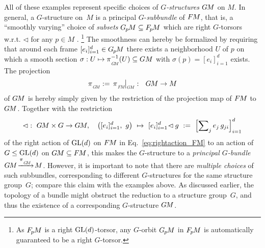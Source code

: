 All of these examples represent specific choices of $G$\emph{-structures} $G\mkern-1.4muM$ on $M$.
In general, a $G$-structure on~$M$ is a principal $G$-\emph{subbundle} of $F\mkern-1.5muM$, that is, a ``smoothly varying'' choice of \emph{subsets} $G_{\mkern-1.3mu p}\mkern-1.2muM \subseteq F_{\mkern-1.5mu p}\mkern-1.0muM$ which are right $G$-torsors w.r.t. $\lhd$ for any $p\in M$ \cite{sternberg1999lectures,piccione2006theory,crainic2013GStructuresExamples}.%
\footnote{\label{footnote:GpM_G_orbit_in_FpM}
    As $F_{\mkern-1.5mu p}\mkern-1.0muM$ is a right $\operatorname{GL}(d)$-torsor, any $G$-orbit $G_{\mkern-1.3mu p}\mkern-1.2muM$ in $F_{\mkern-1.5mu p}\mkern-1.0muM$ is automatically guaranteed to be a right $G$-torsor.
}
The smoothness can hereby be formalized by requiring that around each frame $[e_i]_{i=1}^d \in G_{\mkern-1.3mu p}\mkern-1.2muM$ there exists a neighborhood $U$ of $p$ on which a smooth section $\sigma: U \mapsto \piGM^{-1}(U) \subseteq GM$ with $\sigma(p) = [e_i]_{i=1}^d$ exists.
The projection
\begin{align}
    \piGM :=\, \piFM\mkern-2mu \big|_{\scalebox{.6}{$\GM$}}:\ \ \GM \to M
\end{align}
of $G\mkern-1.4muM$ is hereby simply given by the restriction of the projection map of $F\mkern-1.5muM$ to $G\mkern-1.4muM$.
Together with the restriction
\begin{align}\label{eq:rightaction_GM}
    \lhd:\ \GM\times G \to \GM, \quad
    \big( [e_i]_{i=1}^d,\ g \big)
    \ \mapsto\ 
    [e_i]_{i=1}^d\! \lhd g \ :=\ 
    \left[ \sum\nolimits_j e_j\, g_{ji} \right]_{i=1}^d
\end{align}
of the right action of $\operatorname{GL}(d)$ on $F\mkern-1.5muM$ in Eq.~\eqref{eq:rightaction_FM} to an action of $G \leq \operatorname{GL}(d)$ on $G\mkern-1.4muM \subseteq F\mkern-1.5muM$, this makes the $G$-structure to a \emph{principal $G$-bundle} $\GM\!\xrightarrow{\piGM}\!M$.
However, it is important to note that there are \emph{multiple choices} of such subbundles, corresponding to different $G$-structures for the same structure group~$G$; compare this claim with the examples above.
As discussed earlier, the topology of a bundle might obstruct the reduction to a structure group~$G$, and thus the existence of a corresponding $G$-structure $G\mkern-1.4muM$.


